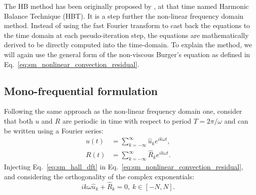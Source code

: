 
The HB method has been originally
proposed by \citet{Hall2002}, at that time named
Harmonic Balance Technique (HBT).
It is a step further the non-linear frequency domain method. Instead
of using the fast Fourier transform to cast back the equations
to the time domain at each pseudo-iteration step, 
the equations are mathematically derived to be directly
computed into the time-domain.
To explain the method, we will again use the general form of 
the non-viscous Burger's equation as defined in
Eq.~\eqref{eq:sm_nonlinear_convection_residual}.


\subsection{Mono-frequential formulation}

Following the same approach as the non-linear frequency domain one,
consider that both $u$ and $R$ are periodic
in time with respect to period $T = 2 \pi / \omega$
and can be written using a Fourier series:
\begin{equation}
	\begin{split}
		u(t) &= \sum_{k=-\infty}^{\infty} \widehat{u}_k e^{i k \omega t}, \\
		R(t) &= \sum_{k=-\infty}^{\infty} \widehat{R}_k e^{i k \omega t}.
		\label{eq:sm_hall_dft}
	\end{split}
\end{equation}
Injecting Eq.~\eqref{eq:sm_hall_dft} in 
Eq.~\eqref{eq:sm_nonlinear_convection_residual}, and considering
the orthogonality of the complex exponentials:
\begin{equation}
	i k \omega \widehat{u}_k + \widehat{R}_k = 0, \: k \in [-N, N].
	\label{eq:sm_hall_frequential_eq}
\end{equation}

